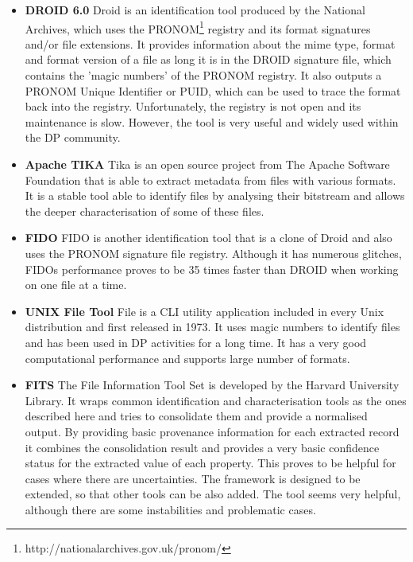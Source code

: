 \begin{itemize}
\item \textbf{DROID 6.0}\newline
Droid is an identification tool produced by the National Archives, which uses the PRONOM\footnote{http://nationalarchives.gov.uk/pronom/} registry and its format signatures and/or file extensions. It provides information about the mime type, format and format version of a file as long it is in the DROID signature file, which contains the 'magic numbers' of the PRONOM registry. It also outputs a PRONOM Unique Identifier or PUID, which can be used to trace the format back into the registry.
Unfortunately, the registry is not open and its maintenance is slow. However, the tool is very useful and widely used within the DP community.

\item \textbf{Apache TIKA}\newline
Tika is an open source project from The Apache Software Foundation that is able to extract metadata from files with various formats. It is a stable tool able to identify files by analysing their bitstream and allows the deeper characterisation of some of these files.  

\item \textbf{FIDO}\newline
FIDO is another identification tool that is a clone of Droid and also uses the PRONOM signature file registry. Although it has numerous glitches, FIDOs performance proves to be 35 times faster than DROID when working on one file at a time.

\item \textbf{UNIX File Tool}\newline
File is a CLI utility application included in every Unix distribution and first released in 1973. It uses magic numbers to identify files and has been used in DP activities for a long time. It has a very good computational performance and supports large number of formats.

\item \textbf{FITS} \newline
The File Information Tool Set is developed by the Harvard University Library. It wraps common identification and characterisation tools as the ones described here and tries to consolidate them and provide a normalised output. By providing basic provenance information for each extracted record it combines the consolidation result and provides a very basic confidence status for the extracted value of each property. This proves to be helpful for cases where there are uncertainties. The framework is designed to be extended, so that other tools can be also added. The tool seems very helpful, although there are some instabilities and problematic cases.


\end{itemize}
